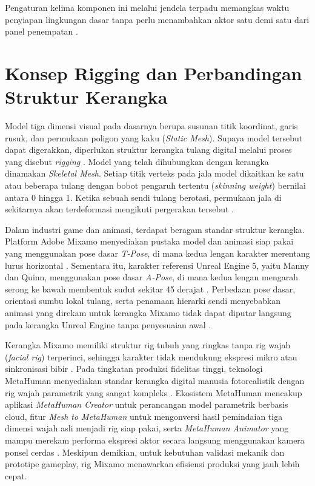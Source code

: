 \documentclass[a4paper,oneside,12pt]{report}
\begin{document}
Pengaturan kelima komponen ini melalui jendela terpadu memangkas waktu penyiapan lingkungan dasar tanpa perlu menambahkan aktor satu demi satu dari panel penempatan \cite{modul6}.

\section{Konsep Rigging dan Perbandingan Struktur Kerangka}
Model tiga dimensi visual pada dasarnya berupa susunan titik koordinat, garis rusuk, dan permukaan poligon yang kaku (\textit{Static Mesh}). Supaya model tersebut dapat digerakkan, diperlukan struktur kerangka tulang digital melalui proses yang disebut \textit{rigging} \cite{epic-skeletal}. Model yang telah dihubungkan dengan kerangka dinamakan \textit{Skeletal Mesh}. Setiap titik verteks pada jala model dikaitkan ke satu atau beberapa tulang dengan bobot pengaruh tertentu (\textit{skinning weight}) bernilai antara 0 hingga 1. Ketika sebuah sendi tulang berotasi, permukaan jala di sekitarnya akan terdeformasi mengikuti pergerakan tersebut \cite{epic-skeletal}.

Dalam industri game dan animasi, terdapat beragam standar struktur kerangka. Platform Adobe Mixamo menyediakan pustaka model dan animasi siap pakai yang menggunakan pose dasar \textit{T-Pose}, di mana kedua lengan karakter merentang lurus horizontal \cite{mixamo-web}. Sementara itu, karakter referensi Unreal Engine 5, yaitu Manny dan Quinn, menggunakan pose dasar \textit{A-Pose}, di mana kedua lengan mengarah serong ke bawah membentuk sudut sekitar 45 derajat \cite{epic-skeletal}. Perbedaan pose dasar, orientasi sumbu lokal tulang, serta penamaan hierarki sendi menyebabkan animasi yang direkam untuk kerangka Mixamo tidak dapat diputar langsung pada kerangka Unreal Engine tanpa penyesuaian awal \cite{modul6}.

Kerangka Mixamo memiliki struktur rig tubuh yang ringkas tanpa rig wajah (\textit{facial rig}) terperinci, sehingga karakter tidak mendukung ekspresi mikro atau sinkronisasi bibir \cite{mixamo-web}. Pada tingkatan produksi fidelitas tinggi, teknologi MetaHuman menyediakan standar kerangka digital manusia fotorealistik dengan rig wajah parametrik yang sangat kompleks \cite{epic-metahuman}. Ekosistem MetaHuman mencakup aplikasi \textit{MetaHuman Creator} untuk perancangan model parametrik berbasis cloud, fitur \textit{Mesh to MetaHuman} untuk mengonversi hasil pemindaian tiga dimensi wajah asli menjadi rig siap pakai, serta \textit{MetaHuman Animator} yang mampu merekam performa ekspresi aktor secara langsung menggunakan kamera ponsel cerdas \cite{modul6,epic-metahuman}. Meskipun demikian, untuk kebutuhan validasi mekanik dan prototipe gameplay, rig Mixamo menawarkan efisiensi produksi yang jauh lebih cepat.
\end{document}
